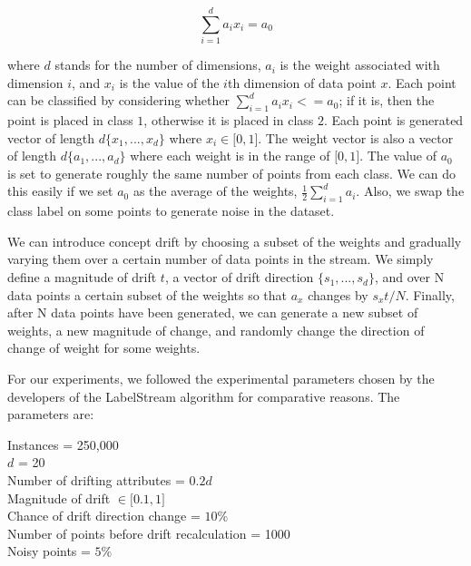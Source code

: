 \documentclass[12pt,a4paper,oneside]{report}
\begin{document}
\[  \sum_{i = 1}^d a_i x_i = a_0 \]

where \(d\) stands for the number of dimensions, \( a_i \) is the weight associated with dimension \(i\),  and \(x_i\) is the value of the \(i\)th dimension of data point \(x\). Each point can be classified by considering whether  \(  \sum_{i = 1}^d a_i x_i <= a_0 \); if it is, then the point is placed in class \(1\), otherwise it is placed in class \(2\). Each point is generated vector of length \( d  \lbrace x_1,...,x_d  \rbrace \) where \( x_i  \in \lbrack  0,1 \rbrack \).  The weight vector is also a vector of length \( d  \lbrace a_1,...,a_d  \rbrace \) where each weight is in the range of \( \lbrack 0,1 \rbrack \).  The value of \( a_0 \) is set to generate roughly the same number of points from each class. We can do this easily if we set \(a_0\) as the average of the weights, \( \frac{1}{2} \sum_{i=1}^d a_i\). Also, we swap the class label on some points to generate noise in the dataset. 

We can introduce concept drift by choosing a subset of the weights and gradually varying them over a certain number of data points in the stream. We simply define a magnitude of drift \(t\), a vector of drift direction  \( \lbrace s_1,...,s_d  \rbrace \), and over N data points a certain subset of the weights so that \( a_x \) changes by \(  s_xt / N \). Finally, after N data points have been generated, we can generate a new subset of weights, a new magnitude of change, and randomly change the direction of change of weight for some weights.

For our experiments, we followed the experimental parameters chosen by the developers of the LabelStream algorithm for comparative reasons. The parameters are:

Instances = 250,000\\
\(d\) = 20 \\
Number of drifting attributes = \(0.2d\)\\
Magnitude of drift \(\in \lbrack 0.1,1\rbrack \) \\
Chance of drift direction change = \(10 \% \) \\
Number of points before drift recalculation  = 1000\\
Noisy points = \(5\% \)
\end{document}
